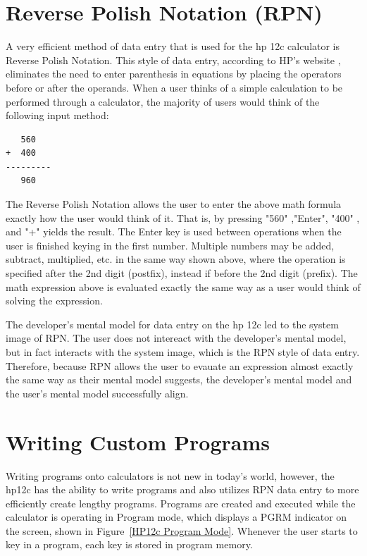 \documentclass{article}
\begin{document}
\section{Reverse Polish Notation (RPN)}

A very efficient method of data entry that is used for the hp 12c calculator is Reverse Polish Notation. This style of data entry, according to HP's website \cite{hp}, eliminates the need to enter parenthesis in equations by placing the operators before or after the operands. When a user thinks of a simple calculation to be performed through a calculator, the majority of users would think of the following input method:
\begin{verbatim}
   560
+  400
---------
   960
\end{verbatim}
The Reverse Polish Notation allows the user to enter the above math formula exactly how the user would think of it. That is, by pressing "560" ,"Enter",  "400" , and "+"  yields the result. The Enter key is used between operations when the user is finished keying in the first number. Multiple numbers may be added, subtract, multiplied, etc. in the same way shown above, where the operation is specified after the 2nd digit (postfix), instead if before the 2nd digit (prefix). The math expression above is evaluated exactly the same way as a user would think of solving the expression.

The developer's mental model for data entry on the hp 12c led to the system image of RPN. The user does not intereact with the developer's mental model, but in fact interacts with the system image, which is the RPN style of data entry. Therefore, because RPN allows the user to evauate an expression almost exactly the same way as their mental model suggests, the developer's mental model and the user's mental model successfully align.

\section{Writing Custom Programs}

Writing programs onto calculators is not new in today's world, however, the hp12c has the ability to write programs and also utilizes RPN data entry to more efficiently create lengthy programs. Programs are created and executed while the calculator is operating in Program mode, which displays a PGRM indicator on the screen, shown in Figure~\ref{HP12c Program Mode}. Whenever the user starts to key in a program, each key is stored in program memory. 
\end{document}
